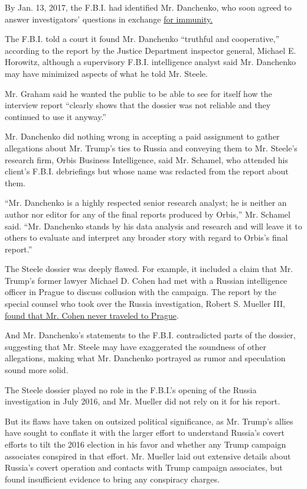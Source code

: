 By Jan. 13, 2017, the F.B.I. had identified Mr. Danchenko, who soon
agreed to answer investigators' questions in exchange
\href{https://www.justice.gov/archives/jm/criminal-resource-manual-719-informal-immunity-distinguished-formal-immunity}{for
immunity.}

The F.B.I. told a court it found Mr. Danchenko ``truthful and
cooperative,'' according to the report by the Justice Department
inspector general, Michael E. Horowitz, although a supervisory F.B.I.
intelligence analyst said Mr. Danchenko may have minimized aspects of
what he told Mr. Steele.

Mr. Graham said he wanted the public to be able to see for itself how
the interview report ``clearly shows that the dossier was not reliable
and they continued to use it anyway.''

Mr. Danchenko did nothing wrong in accepting a paid assignment to gather
allegations about Mr. Trump's ties to Russia and conveying them to Mr.
Steele's research firm, Orbis Business Intelligence, said Mr. Schamel,
who attended his client's F.B.I. debriefings but whose name was redacted
from the report about them.

``Mr. Danchenko is a highly respected senior research analyst; he is
neither an author nor editor for any of the final reports produced by
Orbis,'' Mr. Schamel said. ``Mr. Danchenko stands by his data analysis
and research and will leave it to others to evaluate and interpret any
broader story with regard to Orbis's final report.''

The Steele dossier was deeply flawed. For example, it included a claim
that Mr. Trump's former lawyer Michael D. Cohen had met with a Russian
intelligence officer in Prague to discuss collusion with the campaign.
The report by the special counsel who took over the Russia
investigation, Robert S. Mueller III,
\href{https://www.nytimes.com/interactive/2019/04/18/us/politics/mueller-report-document.html\#g-page-351}{found
that Mr. Cohen never traveled to Prague}.

And Mr. Danchenko's statements to the F.B.I. contradicted parts of the
dossier, suggesting that Mr. Steele may have exaggerated the soundness
of other allegations, making what Mr. Danchenko portrayed as rumor and
speculation sound more solid.

The Steele dossier played no role in the F.B.I.'s opening of the Russia
investigation in July 2016, and Mr. Mueller did not rely on it for his
report.

But its flaws have taken on outsized political significance, as Mr.
Trump's allies have sought to conflate it with the larger effort to
understand Russia's covert efforts to tilt the 2016 election in his
favor and whether any Trump campaign associates conspired in that
effort. Mr. Mueller laid out extensive details about Russia's covert
operation and contacts with Trump campaign associates, but found
insufficient evidence to bring any conspiracy charges.

